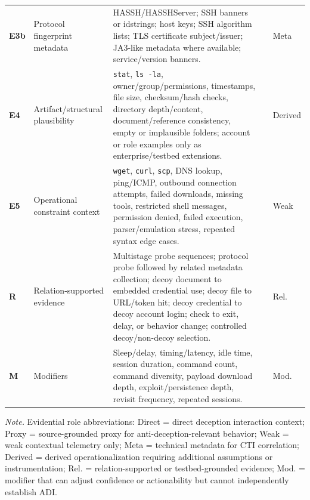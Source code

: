 \begin{table}[!t]
\begin{tabular}[l,l,c,c,c]{p{}p{}p{}p{}p{}}
\textbf{E3b} &
Protocol fingerprint metadata &
HASSH/HASSHServer; SSH banners or idstrings; host keys; SSH algorithm lists; TLS certificate subject/issuer; JA3-like metadata where available; service/version banners. &
\cite{dulaunoy2022ssh,hassh,srinivasa2023gotta} &
Meta \\

\textbf{E4} &
Artifact/structural plausibility &
\texttt{stat}, \texttt{ls -la}, owner/group/permissions, timestamps, file size, checksum/hash checks, directory depth/content, document/reference consistency, empty or implausible folders; account or role examples only as enterprise/testbed extensions. &
\cite{reti2020rabbit,aggarwal2021decoys,miramirkhani2017spotless} &
Derived \\

\textbf{E5} &
Operational constraint context &
\texttt{wget}, \texttt{curl}, \texttt{scp}, DNS lookup, ping/ICMP, outbound connection attempts, failed downloads, missing tools, restricted shell messages, permission denied, failed execution, parser/emulation stress, repeated syntax edge cases. &
\cite{uitto2017survey,chaudhry2026review,miramirkhani2017spotless,cowrie} &
Weak \\

\vspace{1mm}
\textbf{R} &
Relation-supported evidence &
Multistage probe sequences; protocol probe followed by related metadata collection; decoy document to embedded credential use; decoy file to URL/token hit; decoy credential to decoy account login; check to exit, delay, or behavior change; controlled decoy/non-decoy selection. &
\cite{srinivasa2023gotta,reti2020rabbit,afianian2019malware,miramirkhani2017spotless,mitre_attack_t1497,aggarwal2021decoys} &
Rel. \\

\textbf{M} &
Modifiers &
Sleep/delay, timing/latency, idle time, session duration, command count, command diversity, payload download depth, exploit/persistence depth, revisit frequency, repeated sessions. &
\cite{mitre_attack_t1497_003,afianian2019malware,uitto2017survey,pittman2020taxonomy,pittman2020primer} &
Mod. \\

\hline
\end{tabular}

\vspace{1mm}
\begin{minipage}{0.98\textwidth}
\scriptsize
\emph{Note.} Evidential role abbreviations: Direct = direct deception interaction context; Proxy = source-grounded proxy for anti-deception-relevant behavior; Weak = weak contextual telemetry only; Meta = technical metadata for CTI correlation; Derived = derived operationalization requiring additional assumptions or instrumentation; Rel. = relation-supported or testbed-grounded evidence; Mod. = modifier that can adjust confidence or actionability but cannot independently establish ADI.
\end{minipage}
\end{table}
